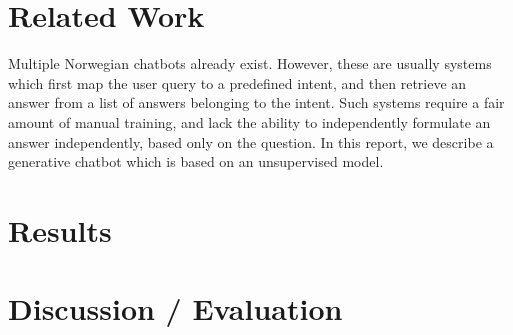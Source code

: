 \documentclass{article}
\begin{document}

\section{Related Work}

Multiple Norwegian chatbots already exist. However, these are usually systems
which first map the user query to a predefined intent, and then retrieve an
answer from a list of answers belonging to the intent. Such systems require a
fair amount of manual training, and lack the ability to independently formulate
an answer independently, based only on the question.  In this report, we
describe a generative chatbot which is based on an unsupervised model.

\section{Results}


\section{Discussion / Evaluation}



\end{document}
